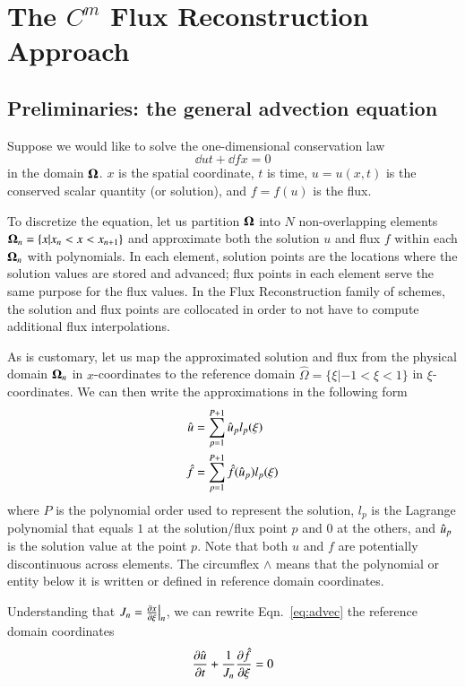 \section{The $C^m$ Flux Reconstruction Approach}

\subsection{Preliminaries: the general advection equation}
Suppose we would like to solve the one-dimensional conservation law
\begin{equation}
\label{eq:advec}
\dd{u}{t} + \dd{f}{x} = 0 
\end{equation}
in the domain ${\boldsymbol{\Omega}}$. $x$ is the spatial coordinate, $t$ is time, $u = u(x,t)$ is the conserved scalar quantity (or solution), and $f=f(u)$ is the flux. 

To discretize the equation, let us partition ${\boldsymbol{\Omega}}$ into $N$ non-overlapping elements ${\boldsymbol{\Omega}}_n = \{x | x_n < x < x_{n+1}\}$ and approximate both the solution $u$  and flux $f$ within each ${\boldsymbol{\Omega}}_n$ with polynomials. In each element, solution points are the locations where the solution values are stored and advanced; flux points in each element serve the same purpose for the flux values. In the Flux Reconstruction family of schemes, the solution and flux points are collocated in order to not have to compute additional flux interpolations.

As is customary, let us map the approximated solution and flux from the physical domain ${\boldsymbol{\Omega}}_n$ in $x$-coordinates to the reference domain $\hat{\Omega}=\{\xi | -1 < \xi < 1\}$ in $\xi$-coordinates. We can then write the approximations in the following form
\begin{align}
 \hat{u} &= \sum^{P+1}_{p=1} \hat{u}_p l_p(\xi) \\ 
 {\hat{f}} &= \sum^{P+1}_{p=1} {\hat{f}}(\hat{u}_p)l_p(\xi)
\end{align}
where $P$ is the polynomial order used to represent the solution, $l_p$ is the Lagrange polynomial that equals $1$ at the solution/flux point $p$ and $0$ at the others, and $\hat{u}_p$ is the solution value at the point $p$. Note that both $u$ and $f$ are potentially discontinuous across elements. 
The circumflex $\wedge$ means that the polynomial or entity below it is written or defined in reference domain coordinates.

Understanding that $J_n = {\frac{\partial x}{\partial \xi}}\big|_n$,
we can rewrite Eqn.~\eqref{eq:advec} the reference domain coordinates
\begin{equation}
 {\frac{\partial \hat{u}}{\partial t}} + \frac{1}{J_n}{\frac{\partial {\hat{f}}}{\partial \xi}} = 0 
\end{equation}

